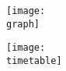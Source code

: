 \documentclass{article}
\begin{document}
	\begin{center}
		\texttt{[image: \\graph]}

		\vspace{5 mm}

		\texttt{[image: \\timetable]}
	\end{center}
\end{document}
